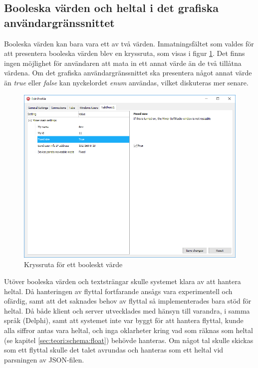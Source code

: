 \subsection{Booleska värden och heltal i det grafiska användargränssnittet}

Booleska värden kan bara vara ett av två värden. Inmatningsfältet som valdes för att presentera booleska värden blev en kryssruta, som visas i figur \ref{fig:bool}. Det finns ingen möjlighet för användaren att mata in ett annat värde än de två tillåtna värdena. Om det grafiska användargränssnittet ska presentera något annat värde än \textit{true} eller \textit{false} kan nyckelordet \textit{enum} användas, vilket diskuteras mer senare.

\begin{figure}
	\includegraphics[width=\textwidth]{./images/gui/bool.png}
	\vspace{-1.7em}
	\caption{Kryssruta för ett booleskt värde}
	\label{fig:bool}
\end{figure}

Utöver booleska värden och textsträngar skulle systemet klara av att hantera heltal. Då hanteringen av flyttal fortfarande ansågs vara experimentell och ofärdig, samt att det saknades behov av flyttal så implementerades bara stöd för heltal. Då både klient och server utvecklades med hänsyn till varandra, i samma språk (Delphi), samt att systemet inte var byggt för att hantera flyttal, kunde alla siffror antas vara heltal, och inga oklarheter kring vad som räknas som heltal (se kapitel \ref{sec:teori:schema:float}) behövde hanteras. Om något tal skulle skickas som ett flyttal skulle det talet avrundas och hanteras som ett heltal vid parsningen av JSON-filen.

